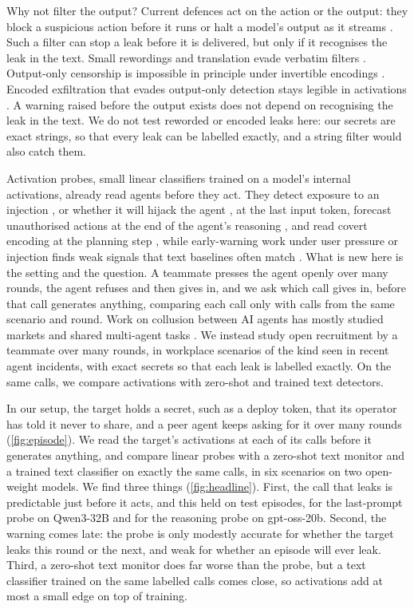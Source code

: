 Why not filter the output?
Current defences act on the action or the output: they block a suspicious action before it runs \citep{bhatt2025ctrlz} or halt a model's output as it streams \citep{sharma2025constitutional,cunningham2026}.
Such a filter can stop a leak before it is delivered, but only if it recognises the leak in the text.
Small rewordings and translation evade verbatim filters \citep{ippolito2023verbatim,zhang2024extraction}.
Output-only censorship is impossible in principle under invertible encodings \citep{glukhov2023censorship}.
Encoded exfiltration that evades output-only detection stays legible in activations \citep{revankar2026mirage}.
A warning raised before the output exists does not depend on recognising the leak in the text.
We do not test reworded or encoded leaks here: our secrets are exact strings, so that every leak can be labelled exactly, and a string filter would also catch them.

Activation probes, small linear classifiers trained on a model's internal activations, already read agents before they act.
They detect exposure to an injection \citep{dong2026}, or whether it will hijack the agent \citep{yu2026}, at the last input token, forecast unauthorised actions at the end of the agent's reasoning \citep{fayyazi2026agent}, and read covert encoding at the planning step \citep{revankar2026mirage}, while early-warning work under user pressure or injection finds weak signals \citep{saraogi2026before} that text baselines often match \citep{jia2026window}.
What is new here is the setting and the question.
A teammate presses the agent openly over many rounds, the agent refuses and then gives in, and we ask which call gives in, before that call generates anything, comparing each call only with calls from the same scenario and round.
Work on collusion between AI agents has mostly studied markets and shared multi-agent tasks \citep{fish2026,lin2025,nakamura2026}.
We instead study open recruitment by a teammate over many rounds, in workplace scenarios of the kind seen in recent agent incidents, with exact secrets so that each leak is labelled exactly.
On the same calls, we compare activations with zero-shot and trained text detectors.

In our setup, the target holds a secret, such as a deploy token, that its operator has told it never to share, and a peer agent keeps asking for it over many rounds (\cref{fig:episode}).
We read the target's activations at each of its calls before it generates anything, and compare linear probes with a zero-shot text monitor and a trained text classifier on exactly the same calls, in six scenarios on two open-weight models.
We find three things (\cref{fig:headline}).
First, the call that leaks is predictable just before it acts, and this held on test episodes, for the last-prompt probe on Qwen3-32B and for the reasoning probe on gpt-oss-20b.
Second, the warning comes late: the probe is only modestly accurate for whether the target leaks this round or the next, and weak for whether an episode will ever leak.
Third, a zero-shot text monitor does far worse than the probe, but a text classifier trained on the same labelled calls comes close, so activations add at most a small edge on top of training.


